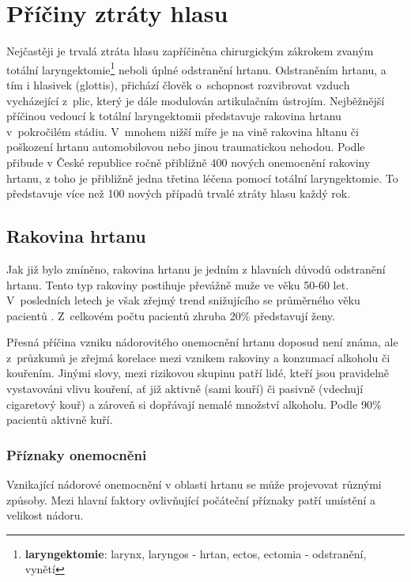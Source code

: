 \section{Příčiny ztráty hlasu}
\label{chap:cause:desease}

Nejčastěji je trvalá ztráta hlasu zapříčiněna chirurgickým zákrokem zvaným
totální laryngektomie\footnote{\textbf{laryngektomie}: larynx, laryngos -
hrtan, ectos, ectomia - odstranění, vynětí} neboli úplné odstranění hrtanu.
Odstraněním hrtanu, a tím i hlasivek (glottis), přichází člověk o~schopnost
rozvibrovat vzduch vycházející z~plic, který je dále modulován artikulačním
ústrojím. Nejběžnější příčinou vedoucí k totální laryngektomii představuje
rakovina hrtanu v~pokročilém stádiu. V~mnohem nižší míře je na vině rakovina
hltanu či poškození hrtanu automobilovou nebo jinou traumatickou nehodou.
Podle \cite{Slavicek2000} přibude v České republice ročně přibližně 400 nových
onemocnění rakoviny hrtanu, z toho je přibližně jedna třetina léčena pomocí
totální laryngektomie. To představuje více než 100 nových případů trvalé
ztráty hlasu každý rok.

\subsection{Rakovina hrtanu} %
\label{chap:cause:desease:cancer}

Jak již bylo zmíněno, rakovina hrtanu je jedním z hlavních důvodů odstranění
hrtanu. Tento typ rakoviny postihuje převážně muže ve věku 50-60 let.
V~posledních letech je však zřejmý trend snižujícího se průměrného věku
pacientů \cite{Skvrnakova2010}. Z~celkovém počtu pacientů zhruba 20\%
představují ženy.

Přesná příčina vzniku nádorovitého onemocnění hrtanu doposud není známa, ale
z~průzkumů je zřejmá korelace mezi vznikem rakoviny a konzumací alkoholu či
kouřením. Jinými slovy, mezi rizikovou skupinu patří lidé, kteří jsou
pravidelně vystavováni vlivu kouření, ať již aktivně (sami kouří) či pasivně
(vdechují cigaretový kouř) a zároveň si dopřávají nemalé množství alkoholu.
Podle \cite{Skvrnakova2010} 90\% pacientů aktivně kuří.

\subsubsection{Příznaky onemocněni} %
\label{chap:cause:desease:cancer:symptom}

Vznikající nádorové onemocnění v oblasti hrtanu se může projevovat různými
způsoby. Mezi hlavní faktory ovlivňující počáteční příznaky patří umístění a
velikost nádoru.

